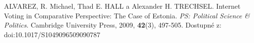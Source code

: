 \begin{thebibliography}{1}

ALVAREZ, R. Michael, Thad E. HALL a Alexander H. TRECHSEL. Internet Voting in Comparative Perspective: The Case of Estonia. \textit{PS: Political Science & Politics}. Cambridge University Press, 2009, \textbf{42}(3), 497-505. Dostupné z: doi:10.1017/S1049096509090787

\end{thebibliography}
